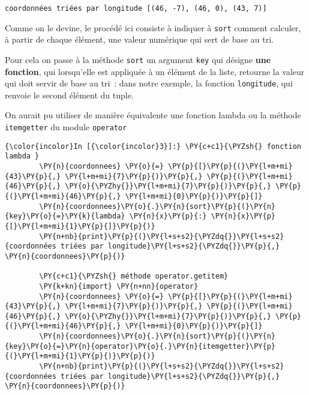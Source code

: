     \begin{Verbatim}[commandchars=\\\{\}]
coordonnées triées par longitude [(46, -7), (46, 0), (43, 7)]

    \end{Verbatim}

    Comme on le devine, le procédé ici consiste à indiquer à \texttt{sort}
comment calculer, à partir de chaque élément, une valeur numérique qui
sert de base au tri.

Pour cela on passe à la méthode \texttt{sort} un argument \texttt{key}
qui désigne \textbf{une fonction}, qui lorsqu'elle est appliquée à un
élément de la liste, retourne la valeur qui doit servir de base au tri~:
dans notre exemple, la fonction \texttt{longitude}, qui renvoie le
second élément du tuple.

    On aurait pu utiliser de manière équivalente une fonction lambda ou la
méthode \texttt{itemgetter} du module \texttt{operator}

    \begin{Verbatim}[commandchars=\\\{\}]
{\color{incolor}In [{\color{incolor}3}]:} \PY{c+c1}{\PYZsh{} fonction lambda }
        \PY{n}{coordonnees} \PY{o}{=} \PY{p}{[}\PY{p}{(}\PY{l+m+mi}{43}\PY{p}{,} \PY{l+m+mi}{7}\PY{p}{)}\PY{p}{,} \PY{p}{(}\PY{l+m+mi}{46}\PY{p}{,} \PY{o}{\PYZhy{}}\PY{l+m+mi}{7}\PY{p}{)}\PY{p}{,} \PY{p}{(}\PY{l+m+mi}{46}\PY{p}{,} \PY{l+m+mi}{0}\PY{p}{)}\PY{p}{]}
        \PY{n}{coordonnees}\PY{o}{.}\PY{n}{sort}\PY{p}{(}\PY{n}{key}\PY{o}{=}\PY{k}{lambda} \PY{n}{x}\PY{p}{:} \PY{n}{x}\PY{p}{[}\PY{l+m+mi}{1}\PY{p}{]}\PY{p}{)}
        \PY{n+nb}{print}\PY{p}{(}\PY{l+s+s2}{\PYZdq{}}\PY{l+s+s2}{coordonnées triées par longitude}\PY{l+s+s2}{\PYZdq{}}\PY{p}{,} \PY{n}{coordonnees}\PY{p}{)}
        
        \PY{c+c1}{\PYZsh{} méthode operator.getitem}
        \PY{k+kn}{import} \PY{n+nn}{operator}
        \PY{n}{coordonnees} \PY{o}{=} \PY{p}{[}\PY{p}{(}\PY{l+m+mi}{43}\PY{p}{,} \PY{l+m+mi}{7}\PY{p}{)}\PY{p}{,} \PY{p}{(}\PY{l+m+mi}{46}\PY{p}{,} \PY{o}{\PYZhy{}}\PY{l+m+mi}{7}\PY{p}{)}\PY{p}{,} \PY{p}{(}\PY{l+m+mi}{46}\PY{p}{,} \PY{l+m+mi}{0}\PY{p}{)}\PY{p}{]}
        \PY{n}{coordonnees}\PY{o}{.}\PY{n}{sort}\PY{p}{(}\PY{n}{key}\PY{o}{=}\PY{n}{operator}\PY{o}{.}\PY{n}{itemgetter}\PY{p}{(}\PY{l+m+mi}{1}\PY{p}{)}\PY{p}{)}
        \PY{n+nb}{print}\PY{p}{(}\PY{l+s+s2}{\PYZdq{}}\PY{l+s+s2}{coordonnées triées par longitude}\PY{l+s+s2}{\PYZdq{}}\PY{p}{,} \PY{n}{coordonnees}\PY{p}{)}
\end{Verbatim}


